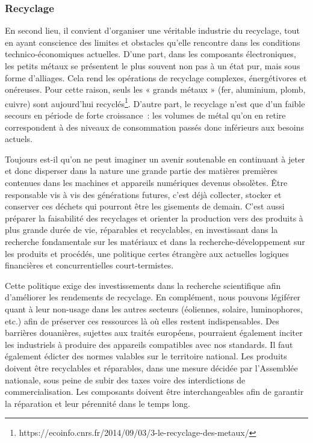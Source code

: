 \documentclass[a4paper]{article}
\begin{document}
\subsubsection{Recyclage}
En second lieu, il convient d’organiser une véritable industrie du recyclage, tout en ayant conscience des limites et obstacles qu’elle rencontre dans les conditions technico-économiques actuelles. D’une part, dans les composants électroniques, les petits métaux se présentent le plus souvent non pas à un état pur, mais sous forme d’alliages. Cela rend les opérations de recyclage complexes, énergétivores et onéreuses. Pour cette raison, seuls les « grands métaux » (fer, aluminium, plomb, cuivre) sont aujourd’hui recyclés\footnote{https://ecoinfo.cnrs.fr/2014/09/03/3-le-recyclage-des-metaux/}. D’autre part, le recyclage n’est que d’un faible secours en période de forte croissance~: les volumes de métal qu’on en retire correspondent à des niveaux de consommation passés donc inférieurs aux besoins actuels. 

Toujours est-il qu’on ne peut imaginer un avenir soutenable en continuant à jeter et donc disperser dans la nature une grande partie des matières premières contenues dans les machines et appareils numériques devenus obsolètes. Être responsable vis à vis des générations futures, c’est déjà collecter, stocker et conserver ces déchets qui pourront être les gisements de demain. C’est aussi préparer la faisabilité des recyclages et orienter la production vers des produits à plus grande durée de vie, réparables et recyclables, en investissant dans la recherche fondamentale sur les matériaux et dans la recherche-développement sur les produits et procédés, une politique certes étrangère aux actuelles logiques financières et concurrentielles court-termistes.

Cette politique exige des investissements dans la recherche scientifique afin d’améliorer les rendements de recyclage. En complément, nous pouvons légiférer quant à leur non-usage dans les autres secteurs (éoliennes, solaire, luminophores, etc.) afin de préserver ces ressources là où elles restent indispensables. Des barrières douanières, sujettes aux traités européens, pourraient également inciter les industriels à produire des appareils compatibles avec nos standards. 
Il faut également édicter des normes valables sur le territoire national. Les produits doivent être recyclables et réparables, dans une mesure décidée par l’Assemblée nationale, sous peine de subir des taxes voire des interdictions de commercialisation. Les composants doivent être interchangeables afin de garantir la réparation et leur pérennité dans le temps long.
\end{document}
